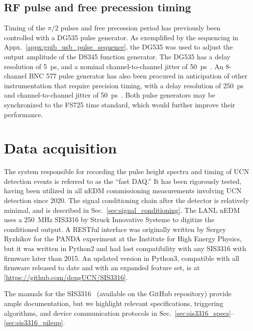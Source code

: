 
\subsection{RF pulse and free precession timing}\label{sec:pulse_gates}


Timing of the $\pi/2$ pulses and free precession period has previously been controlled with a DG535 pulse generator. As exemplified by the sequencing in Appx.~\ref{appx:gpib_usb_pulse_sequence}, the DG535 was used to adjust the output amplitude of the DS345 function generator. The DG535 has a delay resolution of \qty{5}{ps}, and a nominal channel-to-channel jitter of \qty{50}{ps}~\cite{dg535_manual}. An 8-channel BNC 577 pulse generator has also been procured in anticipation of other instrumentation that require precision timing, with a delay resolution of \qty{250}{ps} and channel-to-channel jitter of \qty{50}{ps}~\cite{bnc_577_manual}. Both pulse generators may be synchronized to the FS725 time standard, which would further improve their performance.


\section{Data acquisition}\label{sec:fast_daq}


The system responsible for recording the pulse height spectra and timing of UCN detection events is referred to as the ``fast DAQ.'' It has been rigorously tested, having been utilized in all nEDM commissioning measurements involving UCN detection since 2020. The signal conditioning chain after the detector is relatively minimal, and is described in Sec.~\ref{sec:signal_conditioning}. The LANL nEDM uses a \qty{250}{MHz} SIS3316 by Struck Innovative Systeme to digitize the conditioned output. A RESTful interface was originally written by Sergey Ryzhikov for the PANDA experiment at the Institute for High Energy Physics, but it was written in Python2 and had lost compatibility with any SIS3316 with firmware later than 2015. An updated version in Python3, compatible with all firmware released to date and with an expanded feature set, is at [\url{https://github.com/dougUCN/SIS3316}]. 

The manuals for the SIS3316~\cite{sis3316_manual, sis3316_udp_addendum} (available on the GitHub repository) provide ample documentation, but we highlight relevant specifications, triggering algorithms, and device communication protocols in Sec.~\ref{sec:sis3316_specs}--\ref{sec:sis3316_pileup}.

